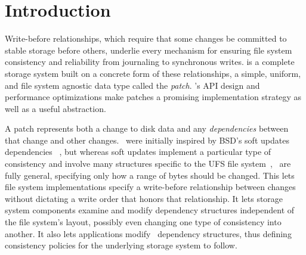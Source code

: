 
\section {Introduction}
\label{sec:intro}

\begin{comment}
This paper aims to evaluate whether a simple, unified abstraction that
represents all modifications to stable storage, including
\emph{dependencies} among modifications, can be used to efficiently
implement a complete file system layer, where modifications are common
and cache sizes are large.
%
The answer is a qualified yes.
\end{comment}


Write-before relationships, which require that some changes be committed
 to stable storage before others, underlie every mechanism for ensuring file system
 consistency and reliability from journaling to synchronous writes.
%
\emph{\Featherstitch} is a complete storage system
 built on a concrete form of these relationships,
 a simple, uniform, and file system agnostic data type called the \emph{patch}.
%
\Kudos's API design and performance optimizations make patches
 a promising implementation strategy as well as a useful abstraction.


\begin{comment}
As file system functionality increases, maintaining file system
 correctness in the presence of failures is increasingly a focus of
 research~\cite{sivathanuetal05-logic,denehyetal05-journal-guided}.
%
File systems today deal with many challenges that make implementing this
 property difficult: power losses, software failures, and even user
 intervention all pose significant threats.
%
To meet this challenge, file systems use a variety of techniques, like
 journaling and soft updates.
%
These mechanisms are each based on imposing some write-before
 relationship among buffered changes to the data in stable storage.
%
The answer is a qualified yes.
\end{comment}


A patch represents both a change to disk data and any \emph{dependencies}
 between that change and other changes. 
%
\Patches\ were initially inspired by BSD's soft updates dependencies%
~\cite{ganger00soft}, but whereas soft updates
 implement a particular type of consistency
 and involve many structures specific to the UFS file
 system~\cite{mckusick99soft}, \patches\ are fully general,
 specifying only how a range of bytes should be changed.
%
This lets file system implementations specify a
 write-before relationship between changes without dictating
 a write order that honors that relationship.
%
It lets storage system components examine and
 modify dependency structures independent of the file system's layout,
 possibly even changing one type of consistency into another.
%
It also lets applications modify \patch\ dependency structures,
 thus defining consistency policies for the underlying
 storage system to follow.



